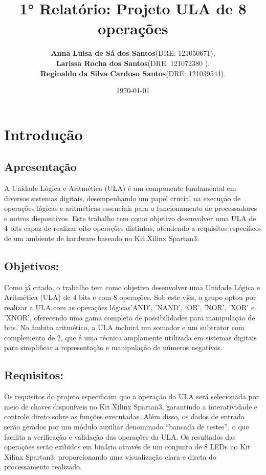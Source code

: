 \documentclass[11pt]{book}
\title{1° Relatório: Projeto ULA de 8 operações}
\author{\textbf{Anna Luisa de Sá dos Santos}(DRE: 121050671),\\ \textbf{Larissa Rocha dos Santos}(DRE: 121072380 ),\\ \textbf{Reginaldo da Silva Cardoso Santos}(DRE: 121039544).\\}
\date{\today}
\begin{document}
    \maketitle
    \frontmatter
    \renewcommand*\contentsname{Sumário}
    \tableofcontents

\chapter{Introdução}
    \section{Apresentação}
    A Unidade Lógica e Aritmética (ULA) é um componente fundamental em diversos sistemas digitais, desempenhando um papel crucial na execução de operações lógicas e aritméticas essenciais para o funcionamento de processadores e outros dispositivos. Este trabalho tem como objetivo desenvolver uma ULA de 4 bits capaz de realizar oito operações distintas, atendendo a requisitos específicos de um ambiente de hardware baseado no Kit Xilinx Spartan3.
    
    \section{Objetivos:}
    Como já citado, o trabalho tem como objetivo desenvolver uma Unidade Lógica e Aritmética (ULA) de 4 bits e com 8 operações. 
    Sob este viés, o grupo optou por realizar a ULA com as operações lógicas'AND', 'NAND', 'OR', 'NOR', 'XOR' e 'XNOR', oferecendo uma gama completa de possibilidades para manipulação de bits. No âmbito aritmético, a ULA incluirá um somador e um subtrator com complemento de 2, que é uma técnica amplamente utilizada em sistemas digitais para simplificar a representação e manipulação de números negativos.
    
    \section{Requisitos:}
    Os requisitos do projeto especificam que a operação da ULA será selecionada por meio de chaves disponíveis no Kit Xilinx Spartan3, garantindo a interatividade e controle direto sobre as funções executadas. Além disso, os dados de entrada serão gerados por um módulo auxiliar denominado “bancada de testes”, o que facilita a verificação e validação das operações da ULA. Os resultados das operações serão exibidos em binário através de um conjunto de 8 LEDs no Kit Xilinx Spartan3, proporcionando uma visualização clara e direta do processamento realizado.
\end{document}
